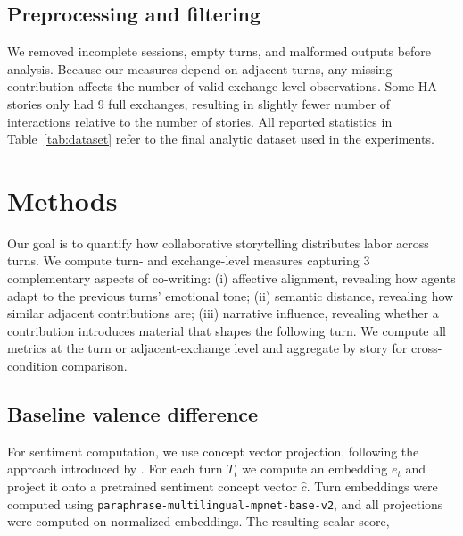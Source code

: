 \documentclass[11pt]{article}
\begin{document}
\subsection{Preprocessing and filtering}
We removed incomplete sessions, empty turns, and malformed outputs before analysis. Because our measures depend on adjacent turns, any missing contribution affects the number of valid exchange-level observations. Some HA stories only had 9 full exchanges, resulting in slightly fewer number of interactions relative to the number of stories. All reported statistics in Table~\ref{tab:dataset} refer to the final analytic dataset used in the experiments. 

\section{Methods}


Our goal is to quantify how collaborative storytelling distributes labor across turns. We compute turn- and exchange-level measures capturing 3 complementary aspects of co-writing: (i) affective alignment, revealing how agents adapt to the previous turns' emotional tone; (ii) semantic distance, revealing how similar adjacent contributions are; (iii) narrative influence, revealing whether a contribution introduces material that shapes the following turn. We compute all metrics at the turn or adjacent-exchange level and aggregate by story for cross-condition comparison.  

\subsection{Baseline valence difference}
For sentiment computation, we use concept vector projection, following the approach introduced by \cite{Lyngbaek_2026}. For each turn $T_t$ we compute an embedding $e_t$ and project it onto a pretrained sentiment concept vector $\hat{c}$. Turn embeddings were computed using \texttt{paraphrase-multilingual-mpnet-base-v2}, and all projections were computed on normalized embeddings. The resulting scalar score,
\end{document}
